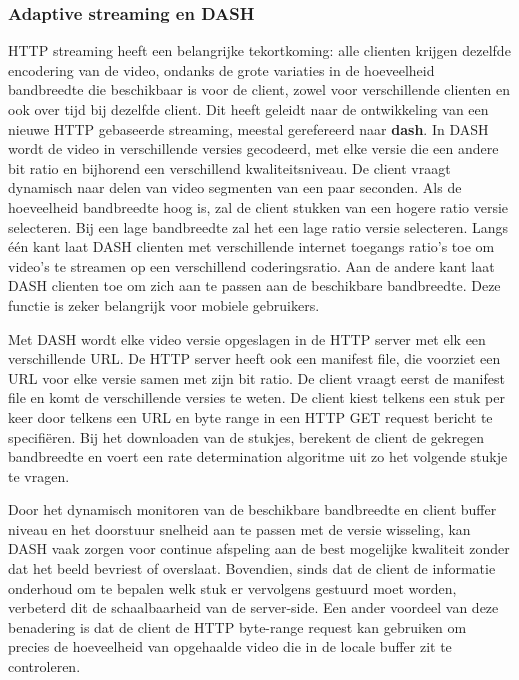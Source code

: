 \subsubsection{Adaptive streaming en DASH}

\noindent HTTP streaming heeft een belangrijke tekortkoming: alle clienten krijgen dezelfde encodering van de video, ondanks de grote variaties in de hoeveelheid bandbreedte die beschikbaar is voor de client, zowel voor verschillende clienten en ook over tijd bij dezelfde client. Dit heeft geleidt naar de ontwikkeling van een nieuwe HTTP gebaseerde streaming, meestal gerefereerd naar \textbf{\acrfull{dash}}. In DASH wordt de video in verschillende  versies gecodeerd, met elke versie die een andere bit ratio en bijhorend een verschillend kwaliteitsniveau. De client vraagt dynamisch naar delen van video segmenten van een paar seconden. Als de hoeveelheid bandbreedte hoog is, zal de client stukken van een hogere ratio versie selecteren. Bij een lage bandbreedte zal het een lage ratio versie selecteren.
Langs één kant laat DASH clienten met verschillende internet toegangs ratio’s toe om video’s te streamen op een verschillend coderingsratio. Aan de andere kant laat DASH clienten toe om zich aan te passen aan de beschikbare bandbreedte. Deze functie is zeker belangrijk voor mobiele gebruikers.

\noindent Met DASH wordt elke video versie opgeslagen in de HTTP server met elk een verschillende URL. De HTTP server heeft ook een manifest file, die voorziet een URL voor elke versie samen met zijn bit ratio. De client vraagt eerst de manifest file en komt de verschillende versies te weten. De client kiest telkens een stuk per keer door telkens een URL en byte range in een HTTP GET request bericht te specifiëren. Bij het downloaden van de stukjes, berekent de client de gekregen bandbreedte en voert een rate determination algoritme uit zo het volgende stukje te vragen.

\noindent Door het dynamisch monitoren van de beschikbare bandbreedte en client buffer niveau en het doorstuur snelheid aan te passen met de versie wisseling, kan DASH vaak zorgen voor continue afspeling aan de best mogelijke kwaliteit zonder dat het beeld bevriest of overslaat. Bovendien, sinds dat de client de informatie onderhoud om te bepalen welk stuk er vervolgens gestuurd moet worden, verbeterd dit de schaalbaarheid van de server-side. Een ander voordeel van deze benadering is dat de client de HTTP byte-range request kan gebruiken om precies de hoeveelheid van opgehaalde video die in de locale buffer zit te controleren.



